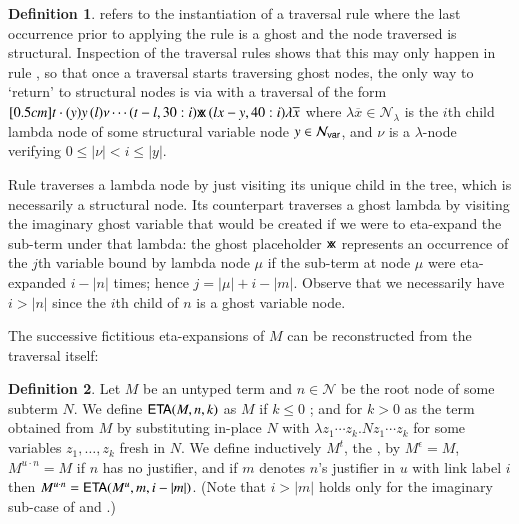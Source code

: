 \documentclass{elsarticle}
\theoremstyle{plain}
\theoremstyle{definition}
\newtheorem{definition}{Definition}[section]
\newcommand\Nodes{\mathcal{N}}%
\newcommand\NodesVar{\Nodes_{\sf var}}%
\newcommand\NodesLmd{\Nodes_\lambda}%
\newcommand{\ghostvar}{\mathsf{x\mkern-5mu x}}
\begin{document}
\begin{definition}
     refers to the instantiation of a traversal rule where the last occurrence prior to applying the rule is a ghost
    and the node traversed is structural.
    Inspection of the traversal rules shows that this may only happen in rule , so that once a traversal starts traversing ghost nodes, the only way to `return' to structural nodes is via  with a traversal of the form
    $
    \Pstr[0.5cm]{ t \cdot (y){y} \, (l){\nu}  \cdots (t-l,30:i){\ghostvar}
        \, (lx-y,40:i){\lambda \overline{x}}}
    $
    where
     $\lambda \overline{x} \in \NodesLmd$ is the $i$th child lambda node of some structural variable node $y \in \NodesVar$,
     and $\nu$ is a $\lambda$-node verifying $0\leq |\nu| < i \leq |y|$.
\end{definition}

Rule  traverses a lambda node by just visiting its unique child  in the tree, which is necessarily a structural node. Its counterpart \rulenamet{Lam^\ghostvar} traverses a ghost lambda by visiting the imaginary ghost variable that would be created if we were to eta-expand the sub-term under that lambda: the ghost placeholder $\ghostvar$ represents an occurrence of the $j$th variable bound by lambda node $\mu$ if the sub-term at node $\mu$ were eta-expanded $i-|n|$ times; hence $j = |\mu| + i - |m|$.
Observe that we necessarily have $i>|n|$ since the $i$th child of $n$ is a ghost variable node.

The successive fictitious eta-expansions of $M$ can be reconstructed from the traversal itself:
\begin{definition}
\label{def:onthefly_etaexpansion}
Let $M$ be an untyped term and $n\in \Nodes$ be the root node of some subterm $N$. We define ${\sf ETA}(M, n, k)$ as $M$
if $k \leq 0$ ; and for $k> 0$ as the term obtained from $M$ by substituting in-place $N$ with $\lambda z_1 \cdots z_k. N z_1 \cdots z_k$ for some variables $z_1, \ldots, z_k$ fresh in $N$.
%
We define inductively $M^t$,  the , by $M^\epsilon = M$,
$M^{u \cdot n} = M$ if $n$ has no justifier, and if $m$ denotes $n$'s justifier in $u$ with link label $i$ then $M^{u \cdot n} = {\sf ETA}(M^{u}, m, i-|m|)$.
%
(Note that $i>|m|$ holds only for the imaginary sub-case of  and .)
\end{definition}
\end{document}

